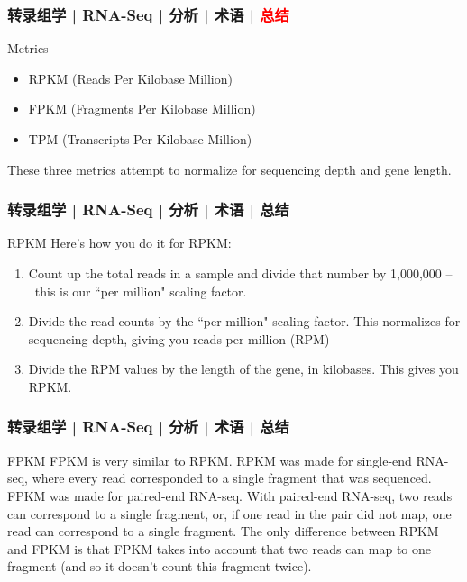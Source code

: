 \begin{frame}
  \frametitle{转录组学 | RNA-Seq | 分析 | 术语 | \textcolor{red}{总结}}
  \begin{block}{Metrics}
    \begin{itemize}
      \item RPKM (Reads Per Kilobase Million)
      \item FPKM (Fragments Per Kilobase Million)
      \item TPM (Transcripts Per Kilobase Million)
    \end{itemize}
        These three metrics attempt to normalize for sequencing depth and gene length. 
  \end{block}
\end{frame}

\begin{frame}
  \frametitle{转录组学 | RNA-Seq | 分析 | 术语 | 总结}
  \begin{block}{RPKM}
    Here's how you do it for RPKM:
    \begin{enumerate}
      \item Count up the total reads in a sample and divide that number by 1,000,000 –\ this is our ``per million" scaling factor.
      \item Divide the read counts by the ``per million" scaling factor. This normalizes for sequencing depth, giving you reads per million (RPM)
      \item Divide the RPM values by the length of the gene, in kilobases. This gives you RPKM.
    \end{enumerate}
  \end{block}
\end{frame}

\begin{frame}
  \frametitle{转录组学 | RNA-Seq | 分析 | 术语 | 总结}
  \begin{block}{FPKM}
 FPKM is very similar to RPKM. RPKM was made for single-end RNA-seq, where every read corresponded to a single fragment that was sequenced. FPKM was made for paired-end RNA-seq. With paired-end RNA-seq, two reads can correspond to a single fragment, or, if one read in the pair did not map, one read can correspond to a single fragment. The only difference between RPKM and FPKM is that FPKM takes into account that two reads can map to one fragment (and so it doesn't count this fragment twice). 
  \end{block}
\end{frame}

